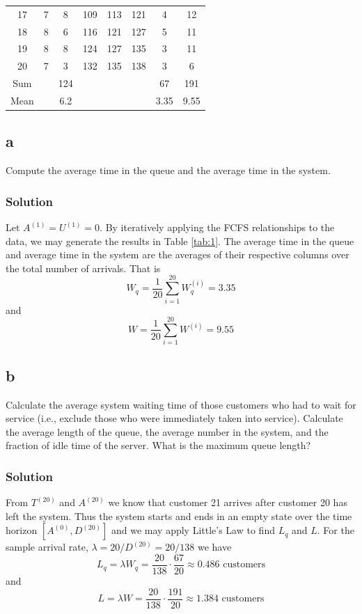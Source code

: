 \documentclass[letterpaper]{amsart}
\begin{document}
\begin{table}
\begin{tabular}{SSSSSSSS}
    17 &   7 &   8 &  109 &  113 &  121 &    4 &  12 \\
    18 &   8 &   6 &  116 &  121 &  127 &    5 &  11 \\
    19 &   8 &   8 &  124 &  127 &  135 &    3 &  11 \\
    20 &   7 &   3 &  132 &  135 &  138 &    3 &   6 \\
    \midrule
    {Sum} & & 124 & & & & 67 & 191\\
    \midrule
    {Mean} & & 6.2 & & & & 3.35 & 9.55\\
    \bottomrule
  \end{tabular}
\end{table}
\subsection*{a}
Compute the average time in the queue and the average time in the
system.
\subsubsection*{Solution}
Let $A^{(1)}=U^{(1)}=0$. By iteratively applying the FCFS relationships to the
data, we may generate the results in Table \ref{tab:1}.
The average time in the queue and average time in the system are the averages of
their respective columns over the total number of arrivals. That is
\begin{equation*}
W_q = \frac{1}{20}\sum_{i=1}^{20}W_q^{(i)}=3.35
\end{equation*}
and
\begin{equation*}
W = \frac{1}{20}\sum_{i=1}^{20}W^{(i)}=9.55
\end{equation*}
\subsection*{b}
Calculate the average system waiting time of those customers who had
to wait for service (i.e., exclude those who were immediately taken into
service). Calculate the average length of the queue, the average number
in the system, and the fraction of idle time of the server.
What is the maximum queue length?
\subsubsection*{Solution}
From $T^{(20)}$ and $A^{(20)}$ we know that customer 21 arrives after customer
20 has left the system. Thus the system starts and ends in an empty state over
the time horizon $[A^{(0)},D^{(20)}]$ and we may apply Little's Law to find $L_q$ and $L$.
For the sample arrival rate, $\lambda=20/D^{(20)}=20/138$ we have
\begin{equation*}
L_q = \lambda W_q= \frac{20}{138}\cdot\frac{67}{20} \approx 0.486\text{ customers}
\end{equation*}
and
\begin{equation*}
L = \lambda W= \frac{20}{138}\cdot\frac{191}{20} \approx 1.384\text{ customers}
\end{equation*}
\end{document}
